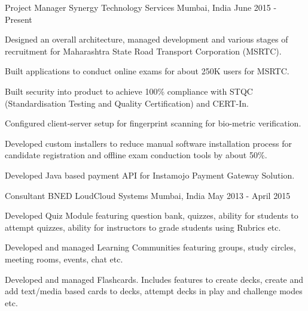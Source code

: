 

\begin{cventries}

  \cventry
    {Project Manager} %
    {Synergy Technology Services} %
    {Mumbai, India} %
    {June 2015 - Present} %
    {
      \begin{cvitems} %
        \item {Designed an overall architecture, managed development and various stages of recruitment for Maharashtra State Road Transport Corporation (MSRTC).}
        \item {Built applications to conduct online exams for about 250K users for MSRTC.}
        \item {Built security into product to achieve 100\% compliance with STQC (Standardisation Testing and Quality Certification) and CERT-In.}
        \item {Configured client-server setup for fingerprint scanning for bio-metric verification.}
        \item {Developed custom installers to reduce manual software installation process for candidate registration and offline exam conduction tools by about 50\%.}
        \item {Developed Java based payment API for Instamojo Payment Gateway Solution.}
      \end{cvitems}
    }

  \cventry
  {Consultant} %
  {BNED LoudCloud Systems} %
  {Mumbai, India} %
  {May 2013 - April 2015} %
  {
  \begin{cvitems} %
    \item {Developed Quiz Module featuring question bank, quizzes, ability for students to attempt quizzes, ability for instructors to grade students using Rubrics etc.}
    \item {Developed and managed Learning Communities featuring groups, study circles, meeting rooms, events, chat etc.}
    \item {Developed and managed Flashcards. Includes features to create decks, create and add text/media based cards to decks, attempt decks in play and challenge modes etc.}
  \end{cvitems}
  }


\end{cventries}
